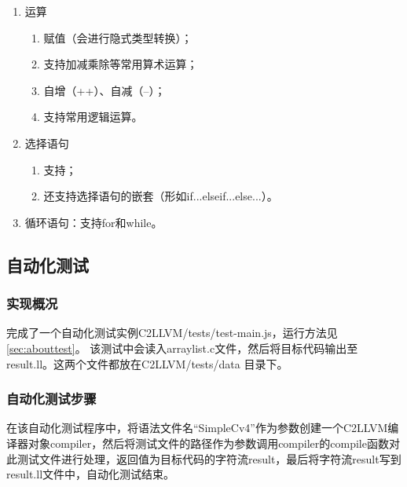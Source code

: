 \documentclass[a4paper]{article}
\begin{document}
\begin{CJK*}{UTF8}{gbsn}
\begin{enumerate}
        \item 运算
        \begin{enumerate}
            \item 赋值（会进行隐式类型转换）；
            \item 支持加减乘除等常用算术运算；
            \item 自增（++）、自减（--）；
            \item 支持常用逻辑运算。
        \end{enumerate}

        \item 选择语句
        \begin{enumerate}
            \item 支持；
            \item 还支持选择语句的嵌套（形如if...else{if...else...}）。
        \end{enumerate}

        \item 循环语句：支持for和while。
    \end{enumerate}

    \subsection{自动化测试}
    \subsubsection{实现概况}
    完成了一个自动化测试实例C2LLVM/tests/test-main.js，运行方法见\ref{sec:abouttest}。 该测试中会读入arraylist.c文件，然后将目标代码输出至result.ll。这两个文件都放在C2LLVM/tests/data 目录下。

    \subsubsection{自动化测试步骤}
    在该自动化测试程序中，将语法文件名“SimpleCv4”作为参数创建一个C2LLVM编译器对象compiler，然后将测试文件的路径作为参数调用compiler的compile函数对此测试文件进行处理，返回值为目标代码的字符流result，最后将字符流result写到result.ll文件中，自动化测试结束。


\end{CJK*}
\end{document}
